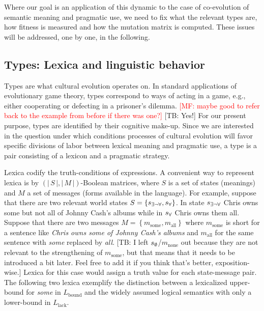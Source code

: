 \documentclass[a4paper]{article}
\newcommand{\mf}[1]{\textcolor{Red}{[MF: #1]}}
\newcommand{\tb}[1]{\textcolor[rgb]{.8,.33,.0}{[TB: #1]}}%
\newcommand{\set}[1]{\left\{#1\right\}}
\newcommand{\card}[1]{\left \lvert \, #1 \, \right\rvert}
\newcommand{\States}{\ensuremath{S}\xspace}		%
\newcommand{\state}{\ensuremath{s}\xspace}		%
\newcommand{\mystate}[1]{\ensuremath{\state_{\text{#1}}}\xspace} %
\newcommand{\mylang}[1]{\ensuremath{L_{\text{#1}}}\xspace} %
\newcommand{\Messgs}{\ensuremath{M}\xspace}		%
\newcommand{\messg}{\ensuremath{m}\xspace}		%
\newcommand{\mymessg}[1]{\ensuremath{\messg_{\text{#1}}}\xspace} %
\newcommand{\ssome}{\mystate{\ensuremath{\exists\neg\forall}}}
\newcommand{\sall}{\mystate{\ensuremath{\forall}}}
\newcommand{\snone}{\mystate{\ensuremath{\emptyset}}}
\newcommand{\msome}{\mymessg{some}}
\newcommand{\mall}{\mymessg{all}}
\newcommand{\mnone}{\mymessg{none}}
\newcommand{\Lbound}{\mylang{bound}}
\newcommand{\Llack}{\mylang{lack}}
\begin{document}
Where our goal is an application of this dynamic to the case of co-evolution of semantic
meaning and pragmatic use, we need to fix what the relevant types are, how fitness is measured
and how the mutation matrix is computed. These issues will be addressed, one by one, in the
following.

\subsection{Types: Lexica and linguistic behavior}
\label{sec:languages+use}

Types are what cultural evolution operates on. In standard applications of evolutionary game
theory, types correspond to ways of acting in a game, e.g., either cooperating or defecting in
a prisoner's dilemma. \mf{maybe good to refer back to the example from before if there was
  one?} \tb{Yes!} For our present purpose, types are identified by their cognitive make-up. Since we are
interested in the question under which conditions processes of cultural evolution will favor
specific divisions of labor between lexical meaning and pragmatic use, a type is a pair
consisting of a lexicon and a pragmatic strategy.

Lexica codify the truth-conditions of expressions. A convenient way to represent lexica is by
$(\card{\States}, \card{\Messgs})$-Boolean matrices, where $\States$ is a set of states
(meanings) and $M$ a set of messages (forms available in the language). For example, suppose
that there are two relevant world states $\States = \set{\ssome, \sall}$. In state $\ssome$
Chris owns some but not all of Johnny Cash's albums while in $\sall$ Chris owns them
all. Suppose that there are two messages $\Messgs = \set{\msome, \mall}$ where $\msome$ is
short for a sentence like \emph{Chris owns some of Johnny Cash's albums} and $\mall$ for the
same sentence with \emph{some} replaced by \emph{all}. \tb{I left $\snone$/$\mnone$ out because they are not relevant to the strengthening of $\msome$, but that means that it needs to be introduced a bit later. Feel free to add it if you think that's better, exposition-wise.} 
Lexica for this case would assign a
truth value for each state-message pair. The following two lexica exemplify the distinction
between a lexicalized upper-bound for \emph{some} in $\Lbound$ and the widely assumed logical
semantics with only a lower-bound in $\Llack$.
\end{document}
